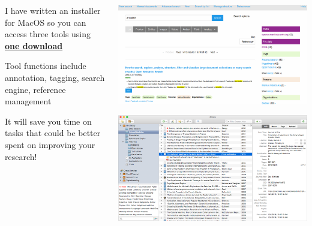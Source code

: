 \documentclass[unknownkeysallowed,usepdftitle=false, parskip=full, aspectratio-1610]{beamer}
\newcommand{\secvariable}{nothing}
\begin{document}
\begin{frame}\label{\secvariable}
    \parbox{\linewidth}{

\begin{columns}[t]
\begin{column}[c]{0.5\textwidth}
      
      I have written an installer for MacOS so you can access three tools using \href{https://github.com/MQ-FOAR705/Osmond-Chiu---Proof-of-Concept---Implementation.git}{\textbf{one download}}
 
      \vspace{12pt}
      
      Tool functions include annotation, tagging, search engine, reference management
      
      \vspace{12pt}
 
      It will save you time on tasks that could be better spent on improving your research!

 \end{column}
    \begin{column}[c]{0.5\textwidth}

 
 \includegraphics[width=1\textwidth,height=0.25\textheight,keepaspectratio]{figure/OpenSemanticSearch.png}\\
 \vspace{12pt}
 
\includegraphics[width=1\textwidth,height=0.25\textheight,keepaspectratio]{figure/Zotero.png}\\
\vspace{12pt}
 

\end{column}
\end{columns}}
\end{frame}
\end{document}

